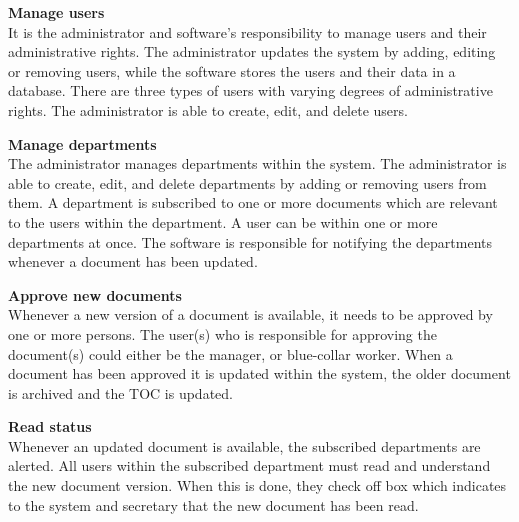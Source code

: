 \textbf{Manage users}
\\
It is the administrator and software's responsibility to manage users and their administrative rights.
The administrator updates the system by adding, editing or removing users, while the software stores the users and their data in a database.
There are three types of users with varying degrees of administrative rights.
The administrator is able to create, edit, and delete users.

\textbf{Manage departments}
\\
The administrator manages departments within the system.
The administrator is able to create, edit, and delete departments by adding or removing users from them.
A department is subscribed to one or more documents which are relevant to the users within the department.
A user can be within one or more departments at once.
The software is responsible for notifying the departments whenever a document has been updated.

\textbf{Approve new documents}
\\
Whenever a new version of a document is available, it needs to be approved by one or more persons.
The user(s) who is responsible for approving the document(s) could either be the manager, or blue-collar worker.
When a document has been approved it is updated within the system, the older document is archived and the TOC is updated.

\textbf{Read status}
\\
Whenever an updated document is available, the subscribed departments are alerted.
All users within the subscribed department must read and understand the new document version.
When this is done, they check off box which indicates to the system and secretary that the new document has been read.
